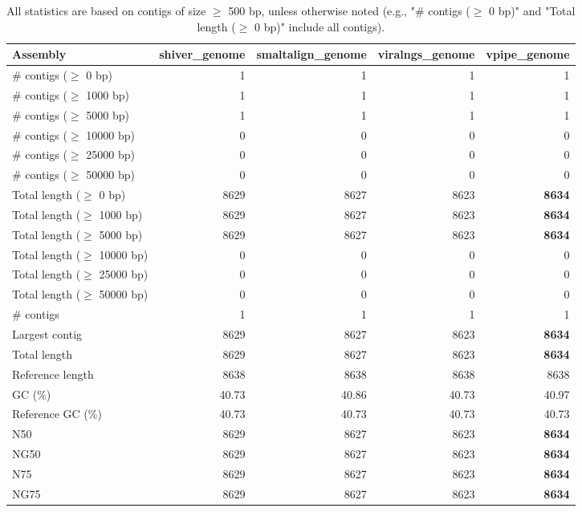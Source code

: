 \documentclass[12pt,a4paper]{article}
\begin{document}
\begin{table}[ht]
\begin{center}
\caption{All statistics are based on contigs of size $\geq$ 500 bp, unless otherwise noted (e.g., "\# contigs ($\geq$ 0 bp)" and "Total length ($\geq$ 0 bp)" include all contigs).}
\begin{tabular}{|l*{4}{|r}|}
\hline
Assembly & shiver\_genome & smaltalign\_genome & viralngs\_genome & vpipe\_genome \\ \hline
\# contigs ($\geq$ 0 bp) & 1 & 1 & 1 & 1 \\ \hline
\# contigs ($\geq$ 1000 bp) & 1 & 1 & 1 & 1 \\ \hline
\# contigs ($\geq$ 5000 bp) & 1 & 1 & 1 & 1 \\ \hline
\# contigs ($\geq$ 10000 bp) & 0 & 0 & 0 & 0 \\ \hline
\# contigs ($\geq$ 25000 bp) & 0 & 0 & 0 & 0 \\ \hline
\# contigs ($\geq$ 50000 bp) & 0 & 0 & 0 & 0 \\ \hline
Total length ($\geq$ 0 bp) & 8629 & 8627 & 8623 & {\bf 8634} \\ \hline
Total length ($\geq$ 1000 bp) & 8629 & 8627 & 8623 & {\bf 8634} \\ \hline
Total length ($\geq$ 5000 bp) & 8629 & 8627 & 8623 & {\bf 8634} \\ \hline
Total length ($\geq$ 10000 bp) & 0 & 0 & 0 & 0 \\ \hline
Total length ($\geq$ 25000 bp) & 0 & 0 & 0 & 0 \\ \hline
Total length ($\geq$ 50000 bp) & 0 & 0 & 0 & 0 \\ \hline
\# contigs & 1 & 1 & 1 & 1 \\ \hline
Largest contig & 8629 & 8627 & 8623 & {\bf 8634} \\ \hline
Total length & 8629 & 8627 & 8623 & {\bf 8634} \\ \hline
Reference length & 8638 & 8638 & 8638 & 8638 \\ \hline
GC (\%) & 40.73 & 40.86 & 40.73 & 40.97 \\ \hline
Reference GC (\%) & 40.73 & 40.73 & 40.73 & 40.73 \\ \hline
N50 & 8629 & 8627 & 8623 & {\bf 8634} \\ \hline
NG50 & 8629 & 8627 & 8623 & {\bf 8634} \\ \hline
N75 & 8629 & 8627 & 8623 & {\bf 8634} \\ \hline
NG75 & 8629 & 8627 & 8623 & {\bf 8634} \\ \hline

\end{tabular}
\end{center}
\end{table}
\end{document}

